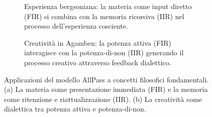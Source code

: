 %






\begin{figure}[htbp]
  \centering
  \begin{subfigure}[b]{0.48\textwidth}
    \centering
    \caption{Esperienza bergsoniana: la materia come input diretto (FIR) si combina con la memoria ricorsiva (IIR) nel processo dell'esperienza cosciente.}
    \label{esperienza}
  \end{subfigure}
  \hfill
  \begin{subfigure}[b]{0.48\textwidth}
    \centering
    \caption{Creatività in Agamben: la potenza attiva (FIR) interagisce con la potenza-di-non (IIR) generando il processo creativo attraverso feedback dialettico.}
    \label{creativita}
  \end{subfigure}
  \caption{Applicazioni del modello AllPass a concetti filosofici fondamentali. (a) La materia come presentazione immediata (FIR) e la memoria come ritenzione e riattualizzazione (IIR). (b) La creatività come dialettica tra potenza attiva e potenza-di-non.}
  \label{fig:filosofia}
\end{figure}



